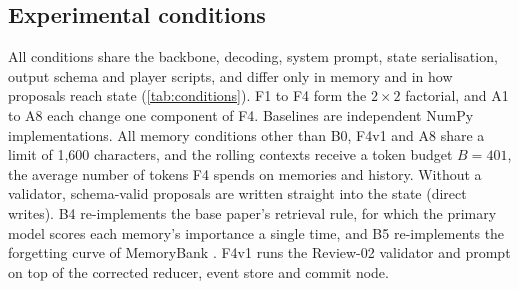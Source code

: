 \documentclass[letterpaper,journal]{IEEEtran}
\begin{document}
\subsection{Experimental conditions}\label{sec:conditions}
All conditions share the backbone, decoding, system prompt, state serialisation, output schema and player scripts, and differ only in memory and in how proposals reach state (\cref{tab:conditions}). F1 to F4 form the $2\times2$ factorial, and A1 to A8 each change one component of F4. Baselines are independent NumPy implementations. All memory conditions other than B0, F4v1 and A8 share a limit of 1{,}600 characters, and the rolling contexts receive a token budget $B=401$, the average number of tokens F4 spends on memories and history. Without a validator, schema-valid proposals are written straight into the state (direct writes). B4 re-implements the base paper's retrieval rule, for which the primary model scores each memory's importance a single time, and B5 re-implements the forgetting curve of MemoryBank \cite{zhong2024memorybank}. F4v1 runs the Review-02 validator and prompt on top of the corrected reducer, event store and commit node.
\end{document}
